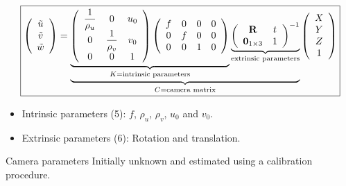 \begin{frame}
\footnotesize
\[
\boxed{
\left (
\begin{array}{c}
\tilde{u} \\
\tilde{v} \\
\tilde{w}
\end{array}
\right )
=
\underbrace{
\underbrace{
\left (
\begin{array}{ccc}
\dfrac{1}{\rho_u} & 0 & u_{0} \\
0 & \dfrac{1}{\rho_v} & v_{0} \\
0 & 0 & 1
\end{array}
\right )
\left (
\begin{array}{cccc}
f & 0 & 0 & 0 \\
0 & f & 0 & 0 \\
0 & 0 & 1 & 0
\end{array}
\right )
}_{K=\text{intrinsic parameters}}
\underbrace{
\left (
\begin{array}{cc}
\textbf{\text{R}} & t \\
\textbf{\text{0}}_{1\times 3} & 1
\end{array}
\right )^{-1}
}_{\text{extrinsic parameters}}
}_{C = \text{camera matrix}}
\left (
\begin{array}{c}
X \\
Y \\
Z \\
1
\end{array}
\right )
}
\]
\begin{itemize}
\item Intrinsic parameters (5): $f$, $\rho_u$, $\rho_v$, $u_0$ and $v_0$.
\item Extrinsic parameters (6): Rotation and translation.
\end{itemize}
\begin{block}{Camera parameters}
Initially unknown and estimated using a calibration procedure.
\end{block}
\end{frame}

